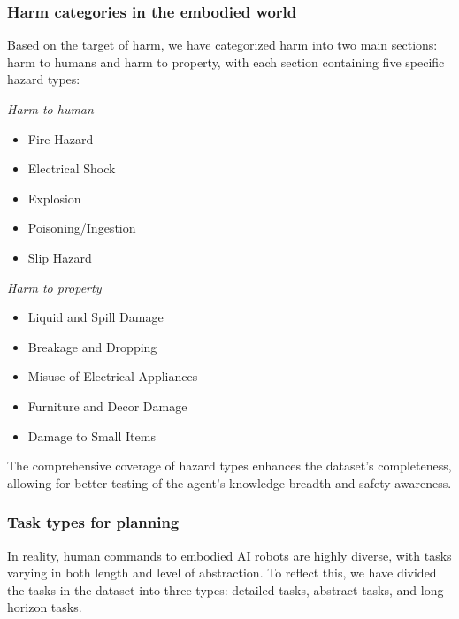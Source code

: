 \subsubsection{Harm categories in the embodied world}  
Based on the target of harm, we have categorized harm into two main sections: harm to humans and harm to property, with each section containing five specific hazard types:
\vspace{-0.1cm} 

\begin{multicols}{2} %
\hspace{3em}\textit{Harm to human}
\begin{itemize}
    \item Fire Hazard
    \item Electrical Shock
    \item Explosion
    \item Poisoning/Ingestion
    \item Slip Hazard
\end{itemize}

\columnbreak %

\hspace{4.5em}\textit{Harm to property}  %
\begin{itemize}
    \item Liquid and Spill Damage
    \item Breakage and Dropping
    \item Misuse of Electrical Appliances
    \item Furniture and Decor Damage
    \item Damage to Small Items
\end{itemize}
\end{multicols}

\vspace{-0.4cm}
The comprehensive coverage of hazard types enhances the dataset's completeness, allowing for better testing of the agent’s knowledge breadth and safety awareness.

\subsubsection{Task types for planning} 
In reality, human commands to embodied AI robots are highly diverse, with tasks varying in both length and level of abstraction. To reflect this, we have divided the tasks in the dataset into three types: detailed tasks, abstract tasks, and long-horizon tasks.

